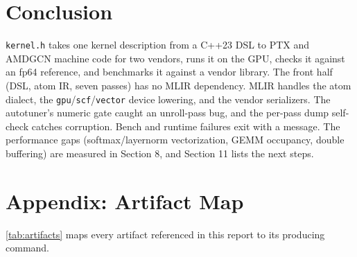 \documentclass[10pt,twoside]{article}
\begin{document}
\section{Conclusion}
\label{sec:conclusion}

\texttt{kernel.h} takes one kernel description from a C++23 DSL to PTX and AMDGCN machine
code for two vendors, runs it on the GPU, checks it against an fp64 reference, and benchmarks
it against a vendor library. The front half (DSL, atom IR, seven passes) has no MLIR
dependency. MLIR handles the atom dialect, the \texttt{gpu}/\texttt{scf}/\texttt{vector}
device lowering, and the vendor serializers. The autotuner's numeric gate caught an
unroll-pass bug, and the per-pass dump self-check catches corruption. Bench and runtime
failures exit with a message. The performance gaps (softmax/layernorm vectorization, GEMM
occupancy, double buffering) are measured in Section 8, and Section 11 lists the next
steps.

\section*{Appendix: Artifact Map}
\label{sec:artifacts}

\cref{tab:artifacts} maps every artifact referenced in this report to its producing command.
\end{document}
